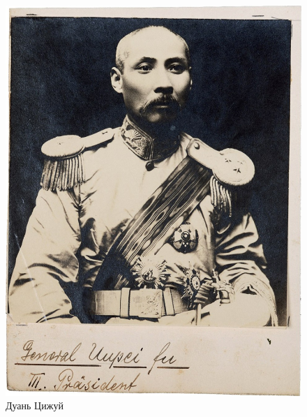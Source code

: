 \begin{figure}[h!tb] 
	\centering\includegraphics[scale=0.4]{Glava4/WVQAAPD5EGk.jpg}
	\caption{Дуань Цижуй}%
\end{figure}


